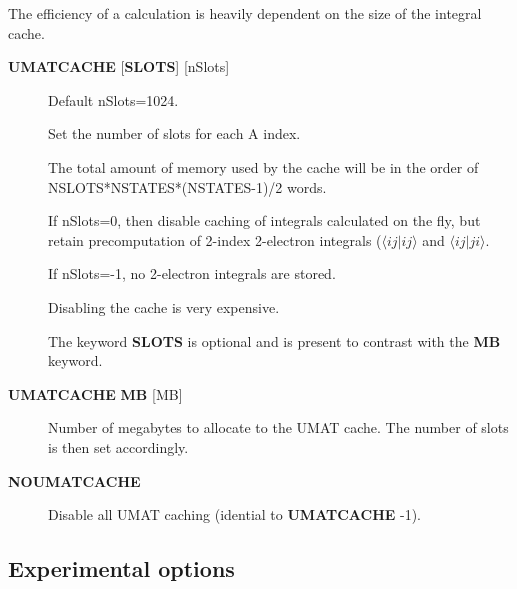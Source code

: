 \documentclass[openany,a4paper,10pt,english]{manual}
\newcommand{\bra}{\ensuremath{\langle}}
\newcommand{\ket}{\ensuremath{\rangle}}
\begin{document}
The efficiency of a calculation is heavily dependent on the size of the
integral cache.
\begin{description}
\item[\textbf{UMATCACHE} {[}\textbf{SLOTS}{]} {[}nSlots{]}] \leavevmode
Default nSlots=1024.

Set the number of slots for each A index.

The total amount of memory used by the cache will be in the order of
NSLOTS*NSTATES*(NSTATES-1)/2  words.

If nSlots=0, then disable caching of integrals calculated on the fly,
but retain precomputation of 2-index 2-electron integrals ($\bra
ij | ij \ket$ and $\bra ij | ji \ket$.

If nSlots=-1, no 2-electron integrals are stored.

Disabling the cache is very expensive.

The keyword \textbf{SLOTS} is optional and is present to contrast with
the \textbf{MB} keyword.

\item[\textbf{UMATCACHE} \textbf{MB} {[}MB{]}] \leavevmode
Number of megabytes to allocate to the UMAT cache.  The number of
slots is then set accordingly.

\item[\textbf{NOUMATCACHE}] \leavevmode
Disable all UMAT caching (idential to \textbf{UMATCACHE} -1).

\end{description}


\subsection{Experimental options}
\end{document}

